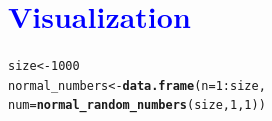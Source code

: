 \documentclass[11pt, a4paper]{article}\usepackage[]{graphicx}\usepackage[]{xcolor}
\makeatletter
\newcommand{\hlnum}[1]{\textcolor[rgb]{0.686,0.059,0.569}{#1}}%
\newcommand{\hlopt}[1]{\textcolor[rgb]{0,0,0}{#1}}%
\newcommand{\hldef}[1]{\textcolor[rgb]{0.345,0.345,0.345}{#1}}%
\newcommand{\hlkwb}[1]{\textcolor[rgb]{0.69,0.353,0.396}{#1}}%
\newcommand{\hlkwc}[1]{\textcolor[rgb]{0.333,0.667,0.333}{#1}}%
\newcommand{\hlkwd}[1]{\textcolor[rgb]{0.737,0.353,0.396}{\textbf{#1}}}%
\newenvironment{kframe}{%
 \def\at@end@of@kframe{}%
 \ifinner\ifhmode%
  \def\at@end@of@kframe{\end{minipage}}%
  \begin{minipage}{\columnwidth}%
 \fi\fi%
 \def\FrameCommand##1{\hskip\@totalleftmargin \hskip-\fboxsep
 \colorbox{shadecolor}{##1}\hskip-\fboxsep
     \hskip-\linewidth \hskip-\@totalleftmargin \hskip\columnwidth}%
 \MakeFramed {\advance\hsize-\width
   \@totalleftmargin\z@ \linewidth\hsize
   \@setminipage}}%
 {\par\unskip\endMakeFramed%
 \at@end@of@kframe}
\newenvironment{knitrout}{}{} %
\makeatother
\begin{document}
\newpage

\section*{\faArrowAltCircleRight[regular] \textcolor{blue}{Visualization}}



\begin{knitrout}
\color{fgcolor}\begin{kframe}
\begin{alltt}
\hldef{size} \hlkwb{<-} \hlnum{1000}
\hldef{normal_numbers} \hlkwb{<-} \hlkwd{data.frame}\hldef{(}\hlkwc{n} \hldef{=} \hlnum{1}\hlopt{:}\hldef{size,}
                          \hlkwc{num} \hldef{=} \hlkwd{normal_random_numbers}\hldef{(size,} \hlnum{1}\hldef{,} \hlnum{1}\hldef{))}
\end{alltt}
\end{kframe}
\end{knitrout}
\end{document}
